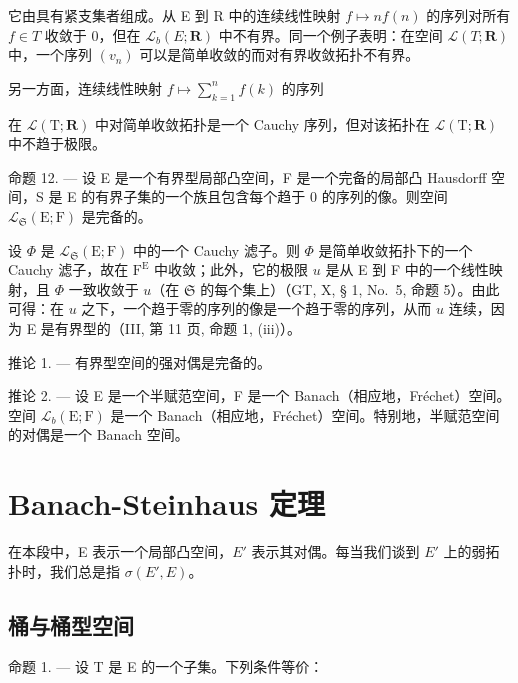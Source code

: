 它由具有紧支集者组成。从 E 到 R 中的连续线性映射 \(f \mapsto nf(n)\) 的序列对所有 \(f \in T\) 收敛于 0，但在 \(\mathcal{L}_{b}(E; \mathbf{R})\) 中不有界。同一个例子表明：在空间 \(\mathcal{L}(T; \mathbf{R})\) 中，一个序列 \((v_{n})\) 可以是简单收敛的而对有界收敛拓扑不有界。

另一方面，连续线性映射 \(f \mapsto \sum_{k=1}^{n} f(k)\) 的序列

在 \(\mathcal{L}(\mathrm{T};\mathbf{R})\) 中对简单收敛拓扑是一个 Cauchy 序列，但对该拓扑在 \(\mathcal{L}(\mathrm{T};\mathbf{R})\) 中不趋于极限。

命题 12. --- 设 E 是一个有界型局部凸空间，F 是一个完备的局部凸 Hausdorff 空间，S 是 E 的有界子集的一个族且包含每个趋于 0 的序列的像。则空间 \(\mathcal{L}_{\mathfrak{S}}(\mathrm{E};\mathrm{F})\) 是完备的。

设 \(\Phi\) 是 \(\mathcal{L}_{\mathfrak{S}}(\mathrm{E};\mathrm{F})\) 中的一个 Cauchy 滤子。则 \(\Phi\) 是简单收敛拓扑下的一个 Cauchy 滤子，故在 \(\mathrm{F}^{\mathrm{E}}\) 中收敛；此外，它的极限 \(u\) 是从 E 到 F 中的一个线性映射，且 \(\Phi\) 一致收敛于 \(u\)（在 \(\mathfrak{S}\) 的每个集上）（GT, X, § 1, No.~5, 命题 5）。由此可得：在 \(u\) 之下，一个趋于零的序列的像是一个趋于零的序列，从而 \(u\) 连续，因为 E 是有界型的（III, 第 11 页, 命题 1, (iii)）。

推论 1. --- 有界型空间的强对偶是完备的。

推论 2. --- 设 E 是一个半赋范空间，F 是一个 Banach（相应地，Fréchet）空间。空间 \(\mathcal{L}_{b}(\mathrm{E};\mathrm{F})\) 是一个 Banach（相应地，Fréchet）空间。特别地，半赋范空间的对偶是一个 Banach 空间。

\section{Banach-Steinhaus 定理}

在本段中，E 表示一个局部凸空间，\(E'\) 表示其对偶。每当我们谈到 \(E'\) 上的弱拓扑时，我们总是指 \(\sigma(E', E)\)。

\subsection{桶与桶型空间}

命题 1. --- 设 T 是 E 的一个子集。下列条件等价：

